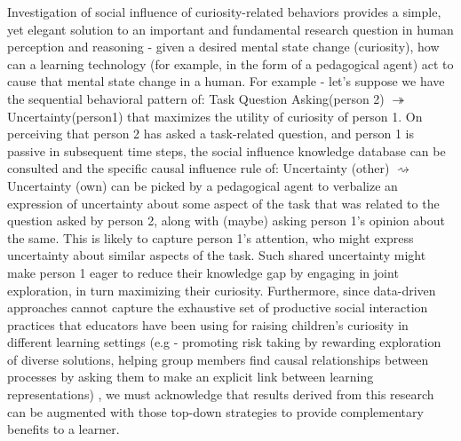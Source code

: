 \documentclass{llncs}
\begin{document}
Investigation of social influence of curiosity-related behaviors provides a simple, yet elegant solution to an important and fundamental research question in human perception and reasoning - given a desired mental state change (curiosity), how can a learning technology (for example, in the form of a pedagogical agent) act to cause that mental state change in a human. For example - let's suppose we have the sequential behavioral pattern of: Task Question Asking(person 2) {\Large $\twoheadrightarrow$} Uncertainty(person1) that maximizes the utility of curiosity of person 1. On perceiving that person 2 has asked a task-related question, and person 1 is passive in subsequent time steps, the social influence knowledge database can be consulted and the specific causal influence rule of: Uncertainty (other) {\Large $\rightsquigarrow$} Uncertainty (own) can be picked by a pedagogical agent to verbalize an expression of uncertainty about some aspect of the task that was related to the question asked by person 2, along with (maybe) asking person 1's opinion about the same. This is likely to capture person 1's attention, who might express uncertainty about similar aspects of the task. Such shared uncertainty might make person 1 eager to reduce their knowledge gap by engaging in joint exploration, in turn maximizing their curiosity. Furthermore, since data-driven approaches cannot capture the exhaustive set of productive social interaction practices that educators have been using for raising children's curiosity in different learning settings (e.g - promoting risk taking by rewarding exploration of diverse solutions, helping group members find causal relationships between processes by asking them to make an explicit link between learning representations) \cite{spektor2013science,correnti2015improving}, we must acknowledge that results derived from this research can be augmented with those top-down strategies to provide complementary benefits to a learner.  
\vspace{-0.45cm}
\end{document}
